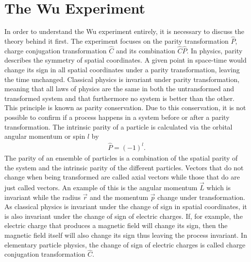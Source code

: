 \chapter{The Wu Experiment}
\label{cha:wu_exp}


In order to understand the Wu experiment entirely, it is necessary to discuss the theory behind it first.
The experiment focuses on the parity transformation $\hat P$, charge conjugation transformation $\hat C$ and its combination $\hat C\hat P$.
In physics, parity describes the symmetry of spatial coordinates.
A given point in space-time would change its sign in all spatial coordinates under a parity transformation, leaving the time unchanged.%
Classical physics is invariant under parity transformation, meaning that all laws of physics are the same in both the untransformed and transformed system and that furthermore no system is better than the other.
This principle is known as parity conservation.
Due to this conservation, it is not possible to confirm if a process happens in a system before or after a parity transformation.
The intrinsic parity of a particle is calculated via the orbital angular momentum or spin $l$ by %
\begin{align}
    \hat P=(-1)^l.
    \label{eq:intrinsicParity}
\end{align}
The parity of an ensemble of particles is a combination of the spatial parity of the system and the intrinsic parity of the different particles.
Vectors that do not change when being transformed are called axial vectors while those that do are just called vectors. 
An example of this is the angular momentum $\vec L$ which is invariant while the radius $\vec r$ and the momentum $\vec p$ change under transformation. \newline
As classical physics is invariant under the change of sign in spatial coordinates, it is also invariant under the change of sign of electric charges.
If, for example, the electric charge that produces a magnetic field will change its sign, then the magnetic field itself will also change its sign thus leaving the process invariant.
In elementary particle physics, the change of sign of electric charges is called charge conjugation transformation $\hat C$.
